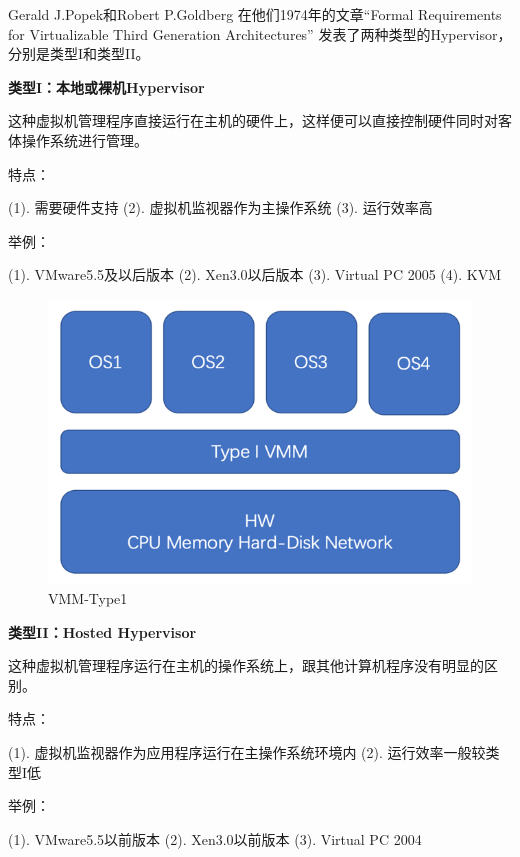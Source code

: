 Gerald J.Popek和Robert P.Goldberg 在他们1974年的文章“Formal Requirements for Virtualizable Third Generation Architectures” 发表了两种类型的Hypervisor，分别是类型I和类型II\cite{Kudinskas}。

\textbf{类型I：本地或裸机Hypervisor}

这种虚拟机管理程序直接运行在主机的硬件上，这样便可以直接控制硬件同时对客体操作系统进行管理。

特点：

    (1). 需要硬件支持
    (2). 虚拟机监视器作为主操作系统
    (3). 运行效率高

举例：

    (1). VMware5.5及以后版本
    (2). Xen3.0以后版本
    (3). Virtual PC 2005
    (4). KVM

\begin{figure}[htb]
  \centering
  \includegraphics{./Figure/IMG_Chap2_2.png}
  \caption{VMM-Type1}\label{Fig:chap2_2}
\end{figure}

\textbf{类型II：Hosted Hypervisor}

这种虚拟机管理程序运行在主机的操作系统上，跟其他计算机程序没有明显的区别。

特点：

    (1). 虚拟机监视器作为应用程序运行在主操作系统环境内
    (2). 运行效率一般较类型I低

举例：

    (1). VMware5.5以前版本
    (2). Xen3.0以前版本
    (3). Virtual PC 2004

